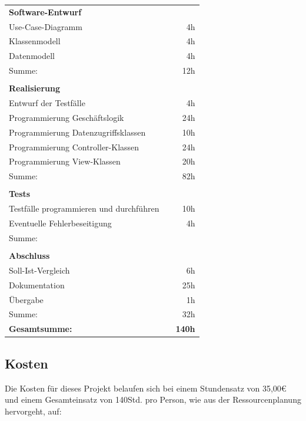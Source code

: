 \documentclass[10pt]{scrarticle}
\begin{document}
\FloatBarrier
\begin{table}[ht!]
\begin{tabular}{lcr}
    \multicolumn{3}{l}{\textbf{Software-Entwurf}}\\
    Use-Case-Diagramm& &4h\\
    Klassenmodell & & 4h\\
    Datenmodell & & 4h\\
    \hline
    Summe: & & 12h\\
    \\
    \multicolumn{3}{l}{\textbf{Realisierung}}\\
    Entwurf der Testfälle & &  4h\\
    Programmierung Geschäftslogik& &  24h\\
    Programmierung Datenzugriffsklassen	& &  10h\\
    Programmierung Controller-Klassen& &  24h\\
    Programmierung View-Klassen& &  20h\\
    \hline
    Summe: & & 82h\\
    \\
    \multicolumn{3}{l}{\textbf{Tests}}\\
    Testfälle programmieren und durchführen& &10h\\
    Eventuelle Fehlerbeseitigung& &4h\\
    \hline
    Summe: & &\\
    \\
    \multicolumn{3}{l}{\textbf{Abschluss}}\\
    Soll-Ist-Vergleich& & 6h\\
    Dokumentation& & 25h\\
    Übergabe & & 1h\\
    \hline
    Summe: & &32h\\
   \textbf{Gesamtsumme:} & &\textbf{ 140h}

\end{tabular}
\end{table}
\FloatBarrier


\subsection{Kosten}

Die Kosten für dieses Projekt belaufen sich bei einem Stundensatz von 35,00\euro{} und einem Gesamteinsatz von 140Std. pro Person, wie aus der Ressourcenplanung hervorgeht, auf:
\end{document}
